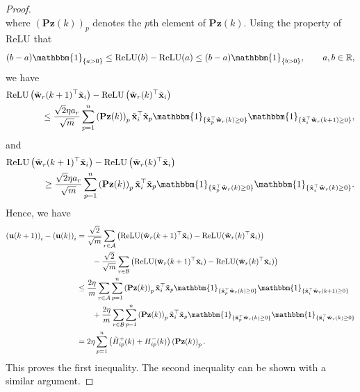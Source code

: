 \begin{proof}
\begin{equation*}
\end{equation*}
where  $\left(\mathbf{P}\mathbf{z}(k)\right)_p$ denotes the $p$th element of $\mathbf{P}\mathbf{z}(k)$. Using the property of ReLU that
\begin{equation*}
    (b-a)\mathbbm{1}_{\{a > 0\}} \leq \relu(b) - \relu(a) \leq (b-a)\mathbbm{1}_{\{b > 0\}}, \qquad a, b \in \R,
\end{equation*}
we have
\begin{align*}
    &\relu\left(\tilde{\mathbf{w}}_r(k+1)^\top \tilde{\mathbf{x}}_i\right) - \relu\left(\tilde{\mathbf{w}}_r(k)^\top \tilde{\mathbf{x}}_i\right) \\
    &\qquad\qquad\leq \frac{\sqrt{2}\eta a_r}{\sqrt{m}} \sum_{p=1}^n \left(\mathbf{P} \mathbf{z}(k)\right)_p \tilde{\mathbf{x}}_i^\top \tilde{\mathbf{x}}_p \mathbbm{1}_{\{\tilde{\mathbf{x}}_p^\top \tilde{\mathbf{w}}_r(k) \geq 0\}} \mathbbm{1}_{\{\tilde{\mathbf{x}}_i^\top \tilde{\mathbf{w}}_r(k+1) \geq 0\}},
    \end{align*}
    and
    \begin{align*}
    &\relu\left(\tilde{\mathbf{w}}_r(k+1)^\top \tilde{\mathbf{x}}_i\right) - \relu\left(\tilde{\mathbf{w}}_r(k)^\top \tilde{\mathbf{x}}_i\right) \\
    &\qquad\qquad\geq \frac{\sqrt{2}\eta a_r}{\sqrt{m}} \sum_{p=1}^n \left(\mathbf{P} \mathbf{z}(k)\right)_p \tilde{\mathbf{x}}_i^\top \tilde{\mathbf{x}}_p \mathbbm{1}_{\{\tilde{\mathbf{x}}_p^\top \tilde{\mathbf{w}}_r(k) \geq 0\}} \mathbbm{1}_{\{\tilde{\mathbf{x}}_i^\top \tilde{\mathbf{w}}_r(k) \geq 0\}}.
\end{align*}
Hence, we have
\begin{align*}
    \left(\mathbf{u}(k+1)\right)_i - \left(\mathbf{u}(k)\right)_i &= \frac{\sqrt{2}}{\sqrt{m}} \sum_{r \in \mathcal{A}} \left(\relu(\tilde{\mathbf{w}}_r(k+1)^\top \tilde{\mathbf{x}}_i) - \relu(\tilde{\mathbf{w}}_r(k)^\top \tilde{\mathbf{x}}_i)\right) \\
    &\qquad - \frac{\sqrt{2}}{\sqrt{m}} \sum_{r \in \mathcal{B}} \left(\relu(\tilde{\mathbf{w}}_r(k+1)^\top \tilde{\mathbf{x}}_i) - \relu(\tilde{\mathbf{w}}_r(k)^\top \tilde{\mathbf{x}}_i)\right) \\
    &\leq \frac{2\eta}{m} \sum_{r \in \mathcal{A}} \sum_{p=1}^n \left(\mathbf{P} \mathbf{z}(k)\right)_p \tilde{\mathbf{x}}_i^\top \tilde{\mathbf{x}}_p \mathbbm{1}_{\{\tilde{\mathbf{x}}_p^\top \tilde{\mathbf{w}}_r(k) \geq 0\}} \mathbbm{1}_{\{\tilde{\mathbf{x}}_i^\top \tilde{\mathbf{w}}_r(k+1) \geq 0\}} \\
    &\qquad +  \frac{2\eta}{m} \sum_{r \in \mathcal{B}} \sum_{p=1}^n \left(\mathbf{P} \mathbf{z}(k)\right)_p \tilde{\mathbf{x}}_i^\top \tilde{\mathbf{x}}_p \mathbbm{1}_{\{\tilde{\mathbf{x}}_p^\top \tilde{\mathbf{w}}_r(k) \geq 0\}} \mathbbm{1}_{\{\tilde{\mathbf{x}}_i^\top \tilde{\mathbf{w}}_r(k) \geq 0\}} \\
    &= 2\eta \sum_{p=1}^n \left(\tilde{{H}}_{ip}^+(k) + {{H}}_{ip}^-(k)\right) \left(\mathbf{P} \mathbf{z}(k)\right)_p.
\end{align*}
This proves the first inequality. The second inequality can be shown with a similar argument.
\end{proof}

